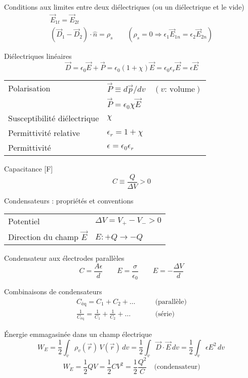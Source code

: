 \documentclass[10pt,landscape]{article}
\newcommand{\extraline}{\vspace{1em}}
\newcommand{\halfline}{\vspace{0.5em}}
\newcommand{\tableindent}{\hspace{1.5em}}
\newcommand{\uvec}[1]{\ensuremath{{\hat{#1}}}}
\begin{document}
\begin{multicols}{3}
\extraline
Conditions aux limites entre deux diélectriques (ou un diélectrique et le vide)
\begin{gather*}
\vec{E}_{1t} =\vec{ E}_{2t}  \\
 (\vec{D}_1 - \vec{D}_2) \cdot \uvec{n} = \rho_s  \qquad (\rho_s=0 \Rightarrow \epsilon_1 \vec{E}_{1n} = \epsilon_2 \vec{E}_{2n})
\end{gather*}

\halfline
Diélectriques linéaires
\[ \vec{D} = \epsilon_0\vec{E} + \vec{P} = \epsilon_0(1+\chi)\vec{E} = \epsilon_0\epsilon_r\vec{E} = \epsilon\vec{E}  \]
\begin{tabular}{@{\tableindent}ll@{}}
	Polarisation  & $\vec{P} \equiv d\vec{p}/dv \quad (\text{$v$: volume})$ \\
	  & $\vec{P} = \epsilon_0\chi\vec{E}$ \\
	Susceptibilité diélectrique  & $\chi$ \\
	Permittivité relative &  $\epsilon_r=1+\chi$ \\
	Permittivité & $\epsilon = \epsilon_0\epsilon_r$
\end{tabular}

\extraline
Capacitance [\si{\farad}] 
\[ C \equiv \frac{Q}{\Delta V}  > 0 \]

\halfline	
Condensateurs : propriétés et conventions  \\
\halfline
\begin{tabular}{@{\tableindent}ll@{}}
	Potentiel  & $\Delta V = V_+ - V_- > 0$ \\
	Direction du champ $\vec{E}$ & $\uvec{E}: +Q \to -Q$ \\
\end{tabular}

\extraline
Condensateur aux électrodes parallèles \[ C = \frac{A\epsilon}{d} 
\qquad 
E = \frac{\sigma}{\epsilon_0}
\qquad
E =  -\frac{\Delta V}{d} \]

Combinaisons de condensateurs \begin{align*}
C_\text{éq} = C_1 + C_2 + \dots  \qquad &\text{(parallèle)} \\
\frac{1}{C_\text{éq}} = \frac{1}{C_1} + \frac{1}{C_2} + \dots \qquad &\text{(série)}
\end{align*}


\halfline
Énergie emmagasinée dans un champ électrique
\[ W_E = \frac{1}{2} \int_v  \rho_v(\vec{r})  \, V(\vec{r}) \, dv 
= \frac{1}{2} \int_v  \vec{D}\cdot\vec{E} \, dv 
= \frac{1}{2} \int_v  \epsilon E^2 \, dv 
\frac{}{}\]
\[ W_E = \frac{1}{2} QV = \frac{1}{2} CV^2 = \frac{1}{2}\frac{Q^2}{C} \quad\text{(condensateur)} \]


\end{multicols}
\end{document}

